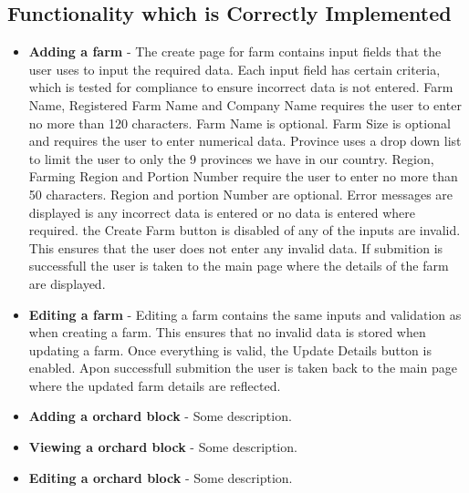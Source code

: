 \documentclass[11pt,fleqn]{book} %
\begin{document}
		\subsection{Functionality which is Correctly Implemented}
			\begin{itemize}
				\item\textbf{Adding a farm} -
				The create page for farm contains input fields that the user uses to input the required data. Each input field has certain criteria, which is tested for compliance to ensure incorrect data is not entered. Farm Name, Registered Farm Name and Company Name requires the user to enter no more than 120 characters. Farm Name is optional. Farm Size is optional and requires the user to enter numerical data. Province uses a drop down list to limit the user to only the 9 provinces we have in our country. Region, Farming Region and Portion Number require the user to enter no more than 50 characters. Region and portion Number are optional. Error messages are displayed is any incorrect data is entered or no data is entered where required. the Create Farm button is disabled of any of the inputs are invalid. This ensures that the user does not enter any invalid data. If submition is successfull the user is taken to the main page where the details of the farm are displayed.
				
				
				\item\textbf{Editing a farm} -
				Editing a farm contains the same inputs and validation as when creating a farm. This ensures that no invalid data is stored when updating a farm. Once everything is valid, the Update Details button is enabled. Apon successfull submition the user is taken back to the main page where the updated farm details are reflected.
				
				\item\textbf{Adding a orchard block} -
				Some description. 
				
				\item\textbf{Viewing a orchard block} -
				Some description.
				
				\item\textbf{Editing a orchard block} -
				Some description.
			\end{itemize}
\end{document}
